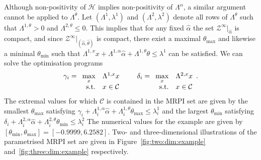 \documentclass[letterpaper, 10pt, conference]{ieeeconf} %
\begin{document}
Although non-positivity of $\mathcal H$ implies non-positivity of $\Lambda^\alpha$, a similar argument cannot be applied to $\Lambda^\theta$.
Let $(\Lambda^1,\lambda^1)$ and $(\Lambda^2,\lambda^2)$ denote all rows of $\Lambda^\theta$ such that $\Lambda^{1,\theta}>0$ and
$\Lambda^{2,\theta}\leq0$. This implies that for any fixed $\hat\alpha$ the set $\mathcal Z^\infty\vert_{\hat\alpha}$
is compact, and since $\mathcal Z^\infty\vert_{(\hat\alpha,\hat\theta)}$
is compact, there exist a maximal $\theta_{\max}$ and likewise a minimal $\theta_{\min}$
such that $\Lambda^{1,x}x+\Lambda^{1,\alpha}\hat\alpha+\Lambda^{1,\theta}\theta\leq\lambda^1$ can be satisfied. We can solve the optimisation programs
$$
	\gamma_i = \begin{array}[t]{rl}
	\displaystyle\max_x& \Lambda^{1,x}x\\
	\text{s.t.}& x\in\mathcal C
	\end{array}
	\qquad
	\delta_i = \begin{array}[t]{rl}
	\displaystyle\max_x& \Lambda^{2,x}x\\
	\text{s.t.}& x\in\mathcal C
	\end{array}
	.
$$
The extremal values for which $\mathcal C$ is contained in the MRPI set are given by
the smallest $\theta_{\max}$ satisfying $\gamma_i+\Lambda^{1,\alpha}_i\hat\alpha+
\Lambda^{1,\theta}_i\theta_{\max}\leq\lambda_i^1$ and the largest $\theta_{\min}$ 
satisfying $\delta_i+\Lambda^{2,\alpha}_i\hat\alpha+\Lambda^{2,\theta}_i\theta_{\min}\leq\lambda_i^2$
The numerical values for the example are given by $[\theta_{\min},\theta_{\max}]=[-0.9999,6.2582]$.
Two- and three-dimensional illustrations of the parametrised MRPI set are given in Figure~\ref{fig:two:dim:example}
and~\ref{fig:three:dim:example} respectively.
%
%
%
\end{document}
